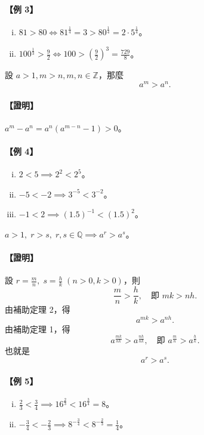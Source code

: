 \paragraph{【例 3】}
\begin{enumerate}[(i)]
    \item $81 > 80 \iff 81^{\frac{1}{4}} = 3 > 80^{\frac{1}{4}} = 2 \cdot 5^{\frac{1}{4}}$。
    \item $100^{\frac{1}{3}} > \frac{9}{2} \iff 100 > \left(\frac{9}{2}\right)^3 = \frac{729}{8}$。
\end{enumerate}

\begin{lemma}
設 $a > 1, m > n, m, n \in \mathbb{Z}$，那麼
\[
a^m > a^n.
\]
\end{lemma}
\paragraph{【證明】} $a^m - a^n = a^n(a^{m-n}-1) > 0$。

\paragraph{【例 4】}
\begin{enumerate}[(i)]
    \item $2 < 5 \implies 2^2 < 2^5$。
    \item $-5 < -2 \implies 3^{-5} < 3^{-2}$。
    \item $-1 < 2 \implies (1.5)^{-1} < (1.5)^2$。
\end{enumerate}

\begin{lemma}
$a > 1,\; r > s,\; r, s \in \mathbb{Q} \implies a^r > a^s$。
\end{lemma}
\paragraph{【證明】} 設 $r = \frac{m}{n},\; s = \frac{h}{k}\; (n>0, k>0)$，則
\[
\frac{m}{n} > \frac{h}{k}, \quad \text{即 } mk > nh.
\]
由補助定理 2，得
\[
a^{mk} > a^{nh}.
\]
由補助定理 1，得
\[
a^{\frac{mk}{nk}} > a^{\frac{nh}{nk}}, \quad \text{即 } a^{\frac{m}{n}} > a^{\frac{h}{k}}.
\]
也就是
\[
a^r > a^s.
\]

\paragraph{【例 5】}
\begin{enumerate}[(i)]
    \item $\frac{2}{3} < \frac{3}{4} \implies 16^{\frac{2}{3}} < 16^{\frac{3}{4}} = 8$。
    \item $-\frac{3}{4} < -\frac{2}{3} \implies 8^{-\frac{3}{4}} < 8^{-\frac{2}{3}} = \frac{1}{4}$。
\end{enumerate}

